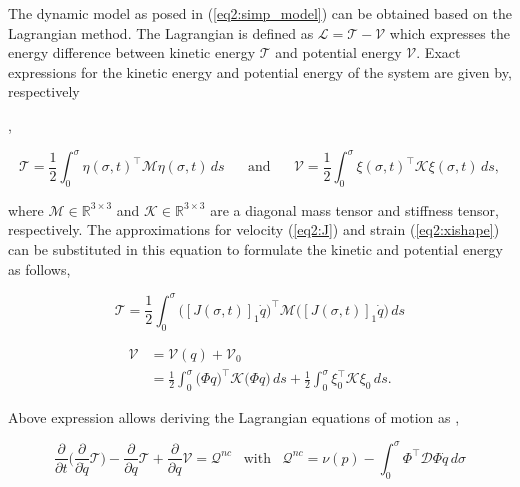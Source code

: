 The dynamic model as posed in (\ref{eq2:simp_model}) can be obtained based on the Lagrangian method. The Lagrangian is defined as $\mathcal{L} = \mathcal{T} -\mathcal{V}$ which expresses the energy difference between kinetic energy $\mathcal{T}$ and potential energy $\mathcal{V}$. Exact expressions for the kinetic energy and potential energy of the system are given by, respectively {\cite{Caasenbrood2020},

\begin{equation}
    \mathcal{T} = \frac{1}{2}\int_0^{\sigma} \eta(\sigma,t)^\top \mathcal{M} \eta(\sigma,t) \hspace{2pt} ds \hspace{20pt} \text{and} \hspace{20pt}  \mathcal{V} = \frac{1}{2}\int_0^{\sigma} \xi(\sigma,t)^\top \mathcal{K} \xi(\sigma,t)  \hspace{2pt} ds,
    \label{eq2:T}
\end{equation}


where $\mathcal{M} \in \mathbb{R}^{3\times3}$ and $\mathcal{K} \in \mathbb{R}^{3\times3}$ are a diagonal mass tensor and stiffness tensor, respectively. The approximations for velocity (\ref{eq2:J}) and strain (\ref{eq2:xishape}) can be substituted in this equation to formulate the kinetic and potential energy as follows,

\begin{equation}
    \mathcal{T} = \frac{1}{2}\int_0^{\sigma} \Big([J(\sigma,t)]_1\dot{q}\Big)^\top \mathcal{M} \Big([J(\sigma,t)]_1\dot{q}\Big) \hspace{2pt} ds
\end{equation}

\begin{equation}
\begin{split}
    \mathcal{V} &= \mathcal{V}(q) + \mathcal{V}_0  \\
                &=  \frac{1}{2}\int_0^{\sigma} \big(\Phi q\big)^\top \mathcal{K} \big(\Phi q\big) \hspace{2pt} ds +\frac{1}{2} \int_0^\sigma \xi_0^\top \mathcal{K} \xi_0  \hspace{2pt} ds .
\end{split}
\end{equation}

Above expression allows deriving the Lagrangian equations of motion as \cite{NWouw},

\begin{equation}
    \frac{\partial}{\partial t}\Big( \frac{\partial}{\partial\dot{q}}\mathcal{T}\Big)- \frac{\partial}{\partial q}\mathcal{T} + \frac{\partial}{\partial q}\mathcal{V} = \mathcal{Q}^{nc} \hspace{10pt} \text{with} \hspace{10pt} \mathcal{Q}^{nc} =  \nu(p) - \int_0^\sigma \Phi^\top \mathcal{D} \Phi \dot{q} \hspace{2pt} d \sigma
    \label{eq2:lagrange}
\end{equation}

}
